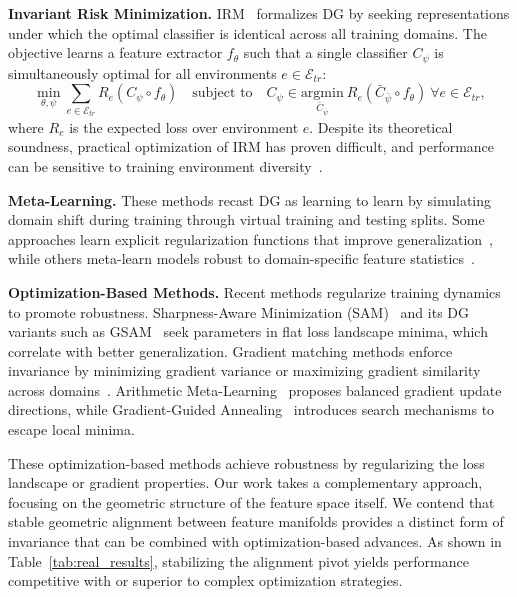 \textbf{Invariant Risk Minimization.} IRM~\citep{arjovsky2019invariant} formalizes DG by seeking representations under which the optimal classifier is identical across all training domains. The objective learns a feature extractor $f_\theta$ such that a single classifier $C_\psi$ is simultaneously optimal for all environments $e \in \mathcal{E}_{tr}$:
\begin{equation}
    \min_{\theta, \psi} \sum_{e \in \mathcal{E}_{tr}} R_e(C_\psi \circ f_\theta) \quad \text{subject to} \quad C_\psi \in \underset{\bar{C}_{\bar{\psi}}}{\text{argmin}} \ R_e(\bar{C}_{\bar{\psi}} \circ f_\theta) \ \forall e \in \mathcal{E}_{tr},
\end{equation}
where $R_e$ is the expected loss over environment $e$. Despite its theoretical soundness, practical optimization of IRM has proven difficult, and performance can be sensitive to training environment diversity~\citep{gulrajani2020search}.

\textbf{Meta-Learning.} These methods recast DG as learning to learn by simulating domain shift during training through virtual training and testing splits. Some approaches learn explicit regularization functions that improve generalization~\citep{balaji2018metareg}, while others meta-learn models robust to domain-specific feature statistics~\citep{dou2019meta_invariant}.

\textbf{Optimization-Based Methods.} Recent methods regularize training dynamics to promote robustness. Sharpness-Aware Minimization (SAM)~\citep{foret2021sharpness} and its DG variants such as GSAM~\citep{zhuang2022surrogate} seek parameters in flat loss landscape minima, which correlate with better generalization. Gradient matching methods enforce invariance by minimizing gradient variance or maximizing gradient similarity across domains~\citep{shi2022gradient, rame2022fishr}. Arithmetic Meta-Learning~\citep{Wang2025BalancedDF} proposes balanced gradient update directions, while Gradient-Guided Annealing~\citep{gga2025} introduces search mechanisms to escape local minima.

These optimization-based methods achieve robustness by regularizing the loss landscape or gradient properties. Our work takes a complementary approach, focusing on the geometric structure of the feature space itself. We contend that stable geometric alignment between feature manifolds provides a distinct form of invariance that can be combined with optimization-based advances. As shown in Table~\ref{tab:real_results}, stabilizing the alignment pivot yields performance competitive with or superior to complex optimization strategies.

